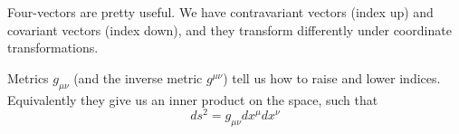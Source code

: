 Four-vectors are pretty useful. We have contravariant vectors (index up) and covariant vectors (index down), and they transform differently under coordinate transformations.

Metrics $g_{\mu\nu}$ (and the inverse metric $g^{\mu\nu}$) tell us how to raise and lower indices. Equivalently they give us an inner product on the space, such that
\begin{equation}
    ds^2 = g_{\mu\nu} dx^\mu dx^\nu
\end{equation}